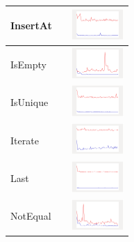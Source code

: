 \begin{longtable}{ m{2.5cm} m{8cm} m{2cm} }
InsertAt &

&
\includegraphics[width=2cm]{../graphs/sequence/small/InsertAt}
\\\hline

IsEmpty &

&
\includegraphics[width=2cm]{../graphs/sequence/small/IsEmpty}
\\\hline

IsUnique &

&
\includegraphics[width=2cm]{../graphs/sequence/small/isUnique}
\\\hline

Iterate &

&
\includegraphics[width=2cm]{../graphs/sequence/small/Iterate}
\\\hline

Last &

&
\includegraphics[width=2cm]{../graphs/sequence/small/Last}
\\\hline

NotEqual &

&
\includegraphics[width=2cm]{../graphs/sequence/small/NEQ}
\\\hline


\end{longtable}
